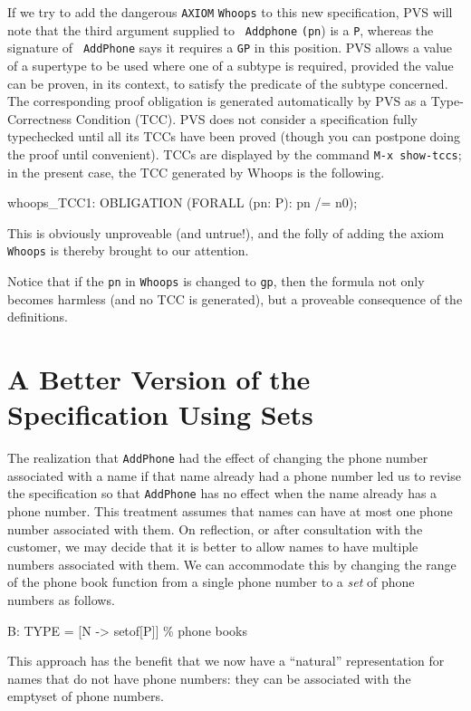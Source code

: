 If we try to add the dangerous {\tt AXIOM} {\tt Whoops} to this new
specification, PVS will note that the third argument supplied to {\tt
Addphone} {\tt (pn}) is a {\tt P}, whereas the signature of {\tt
AddPhone} says it requires a {\tt GP} in this position.  PVS allows a
value of a supertype to be used where one of a subtype is required,
provided the value can be proven, in its context, to satisfy the
predicate of the subtype concerned.  The corresponding proof
obligation is generated automatically by PVS as a Type-Correctness
Condition (TCC).  PVS does not consider a specification fully
typechecked until all its TCCs have been proved (though you can
postpone doing the proof until convenient).  TCCs are displayed by the
command {\tt M-x show-tccs}; in the present case, the TCC generated by
{\rm Whoops} is the following.
\begin{jmrsession}
whoops_TCC1: OBLIGATION (FORALL (pn: P): pn /= n0);
\end{jmrsession}
This is obviously unproveable (and untrue!), and the folly of adding
the axiom {\tt Whoops} is thereby brought to our attention.

Notice that if the {\tt pn} in {\tt Whoops} is changed to {\tt gp},
then the formula not only becomes harmless (and no TCC is generated),
but a proveable consequence of the definitions.

\newpage
{}
\section{A Better Version of the Specification Using Sets}

The realization that {\tt AddPhone} had the effect of changing the
phone number associated with a name if that name already had a phone
number led us to revise the specification so that {\tt AddPhone} has
no effect when the name already has a phone number.  This treatment
assumes that names can have at most one phone number associated with
them.  On reflection, or after consultation with the customer, we may
decide that it is better to allow names to
have multiple numbers associated with them.  We can accommodate this
by changing the range of the phone book function from a single phone
number to a {\em set\/} of phone numbers as follows.
\begin{jmrsession}
  B: TYPE = [N -> setof[P]]   \% phone books
\end{jmrsession}
This approach has the benefit that we now have a ``natural''
representation for names that do not have phone numbers: they can be
associated with the emptyset of phone numbers.

